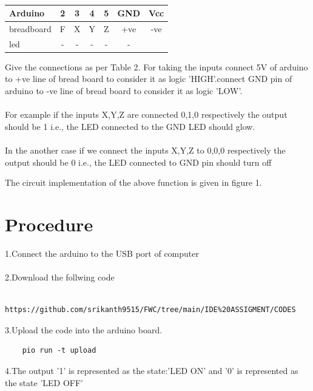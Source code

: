 \documentclass[10pt, a4paper]{article}
\begin{document}
    
    \begin{table}[htbp]
 \begin{center}
    \begin{tabular}{|l|c|c|c|c|c|c|} \hline 
  \textbf{Arduino}& \textbf{2} & \textbf{3}&\textbf{4}&\textbf{5} &\textbf{GND} &\textbf{Vcc}\\
   \hline
 breadboard& F & X & Y & Z & +ve & -ve\\ \hline
led & - & - & - & - & - \\ \hline
\end{tabular}   
\end{center}
\caption{\label{table:dummytable} }
\end{table}
Give the connections as per Table 2. For taking the inputs connect 5V of arduino to +ve line of bread board to consider it as logic 'HIGH'.connect GND pin of arduino to -ve line of bread board to consider it as logic 'LOW'.
\\
\\
For example if the inputs X,Y,Z are connected 0,1,0 respectively the output should be 1 i.e., the LED connected to the GND LED should glow.
\\
\\
In the another case if we connect the inputs X,Y,Z to 0,0,0 respectively the output should be 0 i.e., the LED connected to GND pin should turn off

The circuit implementation of the above function is given in figure 1.




  \section{Procedure}
  1.Connect the arduino to the USB port of computer
  \\
  \\2.Download the follwing code
  \\
  \begin{lstlisting}
    https://github.com/srikanth9515/FWC/tree/main/IDE%20ASSIGMENT/CODES
  \end{lstlisting}
  
  3.Upload the code into the arduino board.
  
  \begin{lstlisting}
    pio run -t upload
  \end{lstlisting}
  
  4.The output '1' is represented as the state:'LED ON' and '0' is represented as the state 'LED OFF'
   



    

    
 
\end{document}
